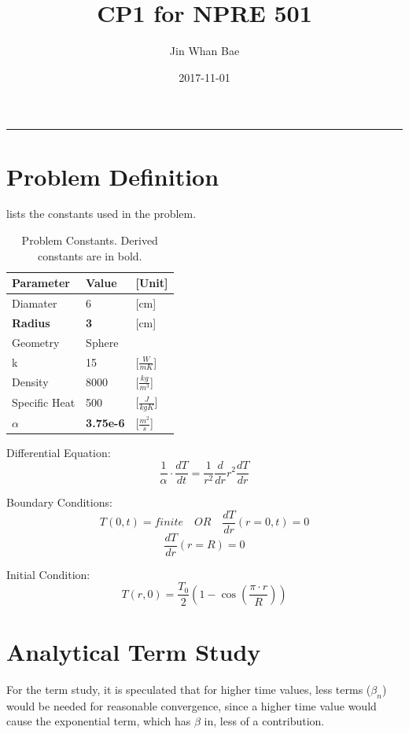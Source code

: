 \documentclass[12pt,letterpaper]{article}
\title{CP1 for NPRE 501}
\author{Jin Whan Bae}
\date{2017-11-01}
\begin{document}
	
	\maketitle
	\hrule
	\onehalfspacing
	\thispagestyle{empty}

\section{Problem Definition}

 lists the constants used in the problem.


\begin{table}[h]
     \centering
    \begin{tabularx}{\textwidth}{bbb}
       \hline
       Parameter & Value & [Unit] \\
       \hline
       Diamater & 6 & [cm] \\
       \textbf{Radius} & \textbf{3} & [cm] \\
       Geometry & Sphere \\
       k & 15 & [$ \frac{W}{mK} $] \\
       Density & 8000 & [$ \frac{kg}{m^3} $] \\
       Specific Heat & 500 & [$ \frac{J}{kgK} $] \\
       \textbf{$ \alpha$} & \textbf{3.75e-6} & [$ \frac{m^2}{s} $] \\
       \hline
    \end{tabularx}
    \caption {Problem Constants. Derived constants are in bold.}
    \label{tab:constants}
\end{table}

Differential Equation:
\[\frac{1}{\alpha} \cdot \frac{dT}{dt} = \frac{1}{r^2} \frac{d}{dr} r^2 \frac{dT}{dr}\]

Boundary Conditions:
\[T(0,t) = finite \quad OR \quad \frac{dT}{dr} (r = 0, t) = 0\]
\[\frac{dT}{dr} (r = R) = 0 \]

Initial Condition:
\[T(r,0) = \frac{T_0}{2} (1-\cos{(\frac{\pi \cdot r}{R})}) \]


\section{Analytical Term Study}
For the term study, it is speculated that for higher time values,
less terms ($\beta_n$) would be needed for reasonable convergence,
since a higher time value would cause the exponential term, which has
$\beta$ in, less of a contribution.
\end{document}
